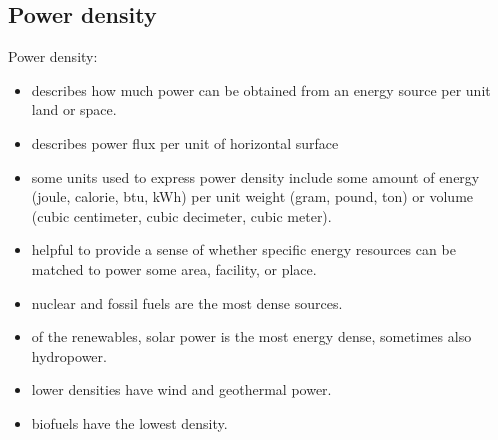 \subsection{Power density}
Power density:
\begin{itemize}
	\item describes how much power can be obtained from an energy source
	per unit land or space.
	\item describes power flux per unit of horizontal surface
	\item some units used to express power density include some amount of
	energy (joule, calorie, btu, kWh) per unit weight (gram, pound, ton)
	or volume (cubic centimeter, cubic decimeter, cubic meter).
	\item helpful to provide a sense of whether specific energy resources
	can be matched to power some area, facility, or place.
	\item nuclear and fossil fuels are the most dense sources.
	\item of the renewables, solar power is the most energy dense,
	sometimes also hydropower.
	\item lower densities have wind and geothermal power.
	\item biofuels have the lowest density.
\end{itemize}
